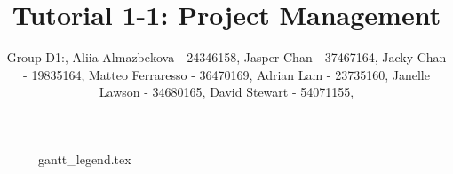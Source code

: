 \documentclass{report}
\title{Tutorial 1-1: Project Management}
\author{
	Group D1:,
	Aliia Almazbekova - 24346158,
	Jasper Chan - 37467164,
	Jacky Chan - 19835164,
	Matteo Ferraresso - 36470169,
	Adrian Lam - 23735160,
	Janelle Lawson - 34680165,
	David Stewart - 54071155,
}
\begin{document}
\maketitle

\begin{figure}
	\centering
	\noindent{}
\end{figure}
\begin{figure}
	\centering
	{gantt_legend.tex}
\end{figure}

\clearpage

\pdfpagewidth 25in
\begin {figure}
	\centering
	\noindent{}
\end{figure}
\end{document}
